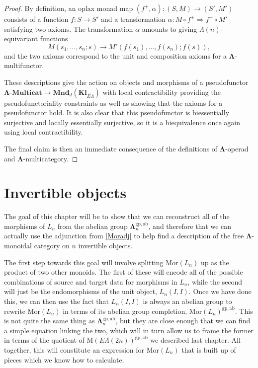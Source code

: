 \documentclass{amsbook} %
\newcommand{\mb}{\mathbf}
\newcommand{\ML}{\mathbf{\Lambda}}
\newcommand{\MLn}{\mathbf{\Lambda}_n}
\newcommand{\MorLn}{\mathrm{Mor}(L_n)}
\newcommand{\ELnn}{E\Lambda(\underline{2n})}
\numberwithin{section}{chapter}
\begin{document}
\begin{proof}
By definition, an oplax monad map $(f^{+}, \alpha) \colon  (S,M) \rightarrow (S', M')$ consists of a function $f \colon S \rightarrow S'$ and a transformation $\alpha \colon M \circ f^{+} \Rightarrow f^{+} \circ M'$ satisfying two axioms.  The transformation $\alpha$ amounts to giving $\Lambda(n)$-equivariant functions
  \[
    M(s_1, \ldots, s_n; s) \rightarrow M'\left(f(s_1), \ldots, f(s_n); f(s)\right),
  \]
and the two axioms correspond to the unit and composition axioms for a $\mb{\Lambda}$-multifunctor.

These descriptions give the action on objects and morphisms of a pseudofunctor $\mb{\Lambda}\mbox{-}\mb{Multicat} \rightarrow \mb{Mnd}_{d}(\mb{Kl}_{\widetilde{E\Lambda}})$ with local contractibility providing the pseudofunctoriality constraints as well as showing that the axioms for a pseudofunctor hold.  It is also clear that this pseudofunctor is biessentially surjective and locally essentially surjective, so it is a biequivalence once again using local contractibility.

The final claim is then an immediate consequence of the definitions of $\mb{\Lambda}$-operad and $\mb{\Lambda}$-multicategory.
\end{proof}


\chapter{Invertible objects}


The goal of this chapter will be to show that we can reconstruct all of the morphisms of $L_n$ from the abelian group $\MLn^{\mathrm{gp, ab}}$, and therefore that we can actually use the adjunction from \cref{Moradj} to help find a description of the free $\ML$-monoidal category on $n$ invertible objects. 

The first step towards this goal will involve splitting $\MorLn$ up as the product of two other monoids. The first of these will encode all of the possible combinations of source and target data for morphisms in $L_n$, while the second will just be the endomorphisms of the unit object, $L_n(I, I)$. 
Once we have done this, we can then use the fact that $L_n(I, I)$ is always an abelian group to rewrite $\MorLn$ in terms of its abelian group completion, $\MorLn^{\mathrm{gp, ab}}$. This is not quite the same thing as $\MLn^{\mathrm{gp, ab}}$, but they are close enough that we can find a simple equation linking the two, which will in turn allow us to frame the former in terms of the quotient of $\mathrm{M}(\ELnn)^{\mathrm{gp, ab}}$ we described last chapter. All together, this will constitute an expression for $\MorLn$ that is built up of pieces which we know how to calculate.
\end{document}
